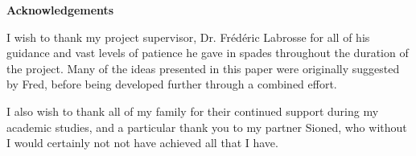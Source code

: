 \thispagestyle{empty}

\begin{center}
    {\LARGE\bf Acknowledgements}
\end{center}

I wish to thank my project supervisor, Dr. Fr\'{e}d\'{e}ric Labrosse for all of his guidance and vast levels of patience he gave in spades throughout the duration of the project. Many of the ideas presented in this paper were originally suggested by Fred, before being developed further through a combined effort. 

I also wish to thank all of my family for their continued support during my academic studies, and a particular thank you to my partner Sioned, who without I would certainly not not have achieved all that I have.